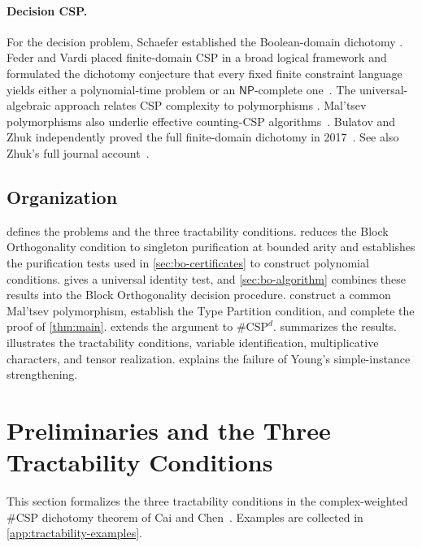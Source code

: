 \documentclass[11pt,letterpaper,onecolumn]{article}
\theoremstyle{plain}
\theoremstyle{definition}
\theoremstyle{remark}
\begin{document}
\paragraph{Decision CSP.}
For the decision problem, Schaefer established the Boolean-domain dichotomy
\cite{Schaefer1978}.  Feder and Vardi placed finite-domain CSP in a broad
logical framework and formulated the dichotomy conjecture that every fixed
finite constraint language yields either a polynomial-time problem or an
$\mathsf{NP}$-complete one~\cite{FederVardi1998}.  The universal-algebraic
approach relates CSP complexity to polymorphisms
\cite{BulatovJeavonsKrokhin2005}. Mal'tsev polymorphisms also underlie
effective counting-CSP algorithms~\cite{DyerRicherby2013}.  Bulatov and Zhuk
independently proved the full finite-domain dichotomy in
2017~\cite{Bulatov2017,Zhuk2017}. See also Zhuk's
full journal account~\cite{Zhuk2020}.




\subsection{Organization}

 defines the problems and the three tractability
conditions.   reduces the Block
Orthogonality condition to singleton purification at bounded arity and
establishes the purification tests used in
\cref{sec:bo-certificates} to construct polynomial conditions.
 gives a universal identity test, and
\cref{sec:bo-algorithm} combines these results into the Block Orthogonality
decision procedure.  
construct a common Mal'tsev polymorphism, establish the Type Partition
condition, and complete the proof of \cref{thm:main}.
 extends the argument to $\#\mathrm{CSP}^{d}$.
 summarizes the results.
 illustrates the tractability conditions,
variable identification, multiplicative characters, and tensor realization.
 explains the failure of Young's
simple-instance strengthening.

\section{Preliminaries and the Three Tractability Conditions}
\label{sec:preliminaries}

This section formalizes the three tractability conditions in the
complex-weighted $\#\mathrm{CSP}$ dichotomy theorem of Cai and
Chen~\cite[Sections~2.8--2.9 and~3.1]{CaiChen2017}. Examples are collected in
\cref{app:tractability-examples}.
\end{document}

